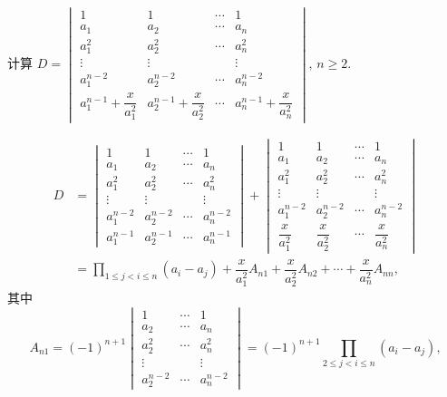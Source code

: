 \documentclass[../../main.tex]{subfiles}%
\begin{document}
\begin{example}
计算 \(D = \begin{vmatrix} 1 & 1 & \cdots & 1 \\ a_1 & a_2 & \cdots & a_n \\ a_1^2 & a_2^2 & \cdots & a_n^2 \\ \vdots & \vdots & & \vdots \\ a_1^{n - 2} & a_2^{n - 2} & \cdots & a_n^{n - 2} \\ a_1^{n - 1} + \dfrac{x}{a_1^2} & a_2^{n - 1} + \dfrac{x}{a_2^2} & \cdots & a_n^{n - 1} + \dfrac{x}{a_n^2} \end{vmatrix}, \, n \geqslant 2\).
\end{example}
\begin{solution}
\[
\begin{aligned}
D &= \begin{vmatrix} 1 & 1 & \cdots & 1 \\ a_1 & a_2 & \cdots & a_n \\ a_1^2 & a_2^2 & \cdots & a_n^2 \\ \vdots & \vdots & & \vdots \\ a_1^{n - 2} & a_2^{n - 2} & \cdots & a_n^{n - 2} \\ a_1^{n - 1} & a_2^{n - 1} & \cdots & a_n^{n - 1} \end{vmatrix} + \begin{vmatrix} 1 & 1 & \cdots & 1 \\ a_1 & a_2 & \cdots & a_n \\ a_1^2 & a_2^2 & \cdots & a_n^2 \\ \vdots & \vdots & & \vdots \\ a_1^{n - 2} & a_2^{n - 2} & \cdots & a_n^{n - 2} \\ \dfrac{x}{a_1^2} & \dfrac{x}{a_2^2} & \cdots & \dfrac{x}{a_n^2} \end{vmatrix} \\
&= \prod_{1 \leqslant j < i \leqslant n} (a_i - a_j) + \dfrac{x}{a_1^2} A_{n1} + \dfrac{x}{a_2^2} A_{n2} + \cdots + \dfrac{x}{a_n^2} A_{nn},
\end{aligned}
\]
其中
\[
A_{n1} = (-1)^{n + 1} \begin{vmatrix} 1 & \cdots & 1 \\ a_2 & \cdots & a_n \\ a_2^2 & \cdots & a_n^2 \\ \vdots & & \vdots \\ a_2^{n - 2} & \cdots & a_n^{n - 2} \end{vmatrix} = (-1)^{n + 1} \prod_{2 \leqslant j < i \leqslant n} (a_i - a_j),
\]
\end{solution}
\end{document}
